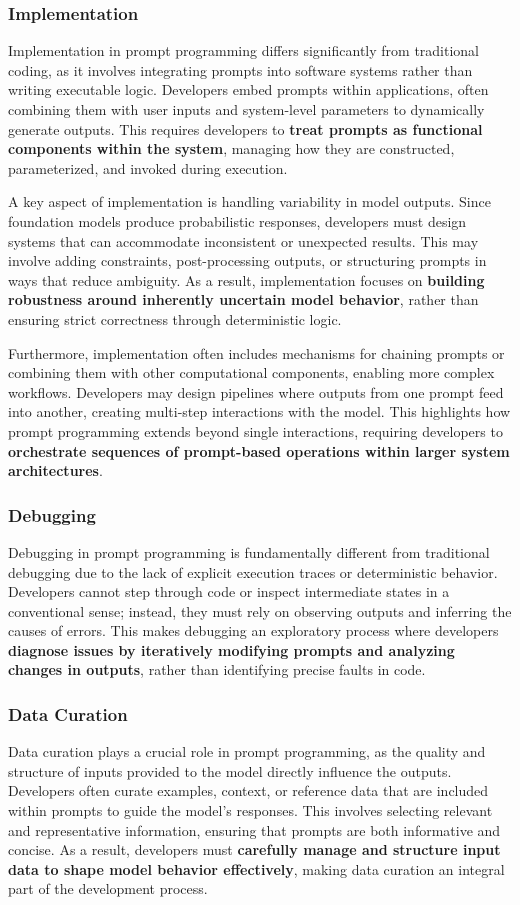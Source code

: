 \subsubsection{Implementation}
Implementation in prompt programming differs significantly from traditional coding, as it involves integrating prompts into software systems rather than writing executable logic. Developers embed prompts within applications, often combining them with user inputs and system-level parameters to dynamically generate outputs. This requires developers to \textbf{treat prompts as functional components within the system}, managing how they are constructed, parameterized, and invoked during execution.

A key aspect of implementation is handling variability in model outputs. Since foundation models produce probabilistic responses, developers must design systems that can accommodate inconsistent or unexpected results. This may involve adding constraints, post-processing outputs, or structuring prompts in ways that reduce ambiguity. As a result, implementation focuses on \textbf{building robustness around inherently uncertain model behavior}, rather than ensuring strict correctness through deterministic logic.

Furthermore, implementation often includes mechanisms for chaining prompts or combining them with other computational components, enabling more complex workflows. Developers may design pipelines where outputs from one prompt feed into another, creating multi-step interactions with the model. This highlights how prompt programming extends beyond single interactions, requiring developers to \textbf{orchestrate sequences of prompt-based operations within larger system architectures}.

\subsubsection{Debugging}
Debugging in prompt programming is fundamentally different from traditional debugging due to the lack of explicit execution traces or deterministic behavior. Developers cannot step through code or inspect intermediate states in a conventional sense; instead, they must rely on observing outputs and inferring the causes of errors. This makes debugging an exploratory process where developers \textbf{diagnose issues by iteratively modifying prompts and analyzing changes in outputs}, rather than identifying precise faults in code.

\subsubsection{Data Curation}
Data curation plays a crucial role in prompt programming, as the quality and structure of inputs provided to the model directly influence the outputs. Developers often curate examples, context, or reference data that are included within prompts to guide the model’s responses. This involves selecting relevant and representative information, ensuring that prompts are both informative and concise. As a result, developers must \textbf{carefully manage and structure input data to shape model behavior effectively}, making data curation an integral part of the development process.

